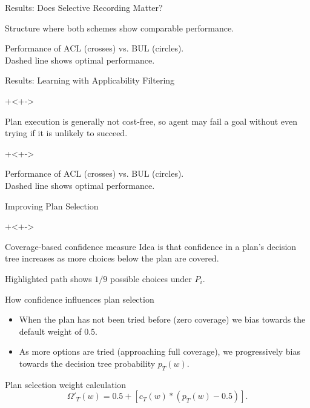 \documentclass[]{beamer}
\begin{document}
\begin{frame}[allowframebreaks]{Results: Does Selective Recording Matter?}

\centering\resizebox{.7\paperwidth}{!}{}

Structure where both schemes show \alert{comparable performance}.

\centering\resizebox{.7\paperwidth}{!}{}

Performance of ACL (crosses) vs. BUL (circles). \\Dashed line shows optimal performance.

\end{frame}

\begin{frame}{Results: Learning with Applicability Filtering}

\onslide+<+->

\begin{block}{}
Plan execution is generally not cost-free, so agent may fail a goal \alert{without even trying} if it is unlikely to succeed.
\end{block}
\onslide+<+->

\centering\resizebox{.7\paperwidth}{!}{}

Performance of ACL (crosses) vs. BUL (circles). \\Dashed line shows optimal performance.

\end{frame}

\begin{frame}[allowframebreaks]{Improving Plan Selection}

\onslide+<+->
\begin{block}{Coverage-based confidence measure}
Idea is that confidence in a plan's decision tree increases as more choices below the plan are \alert{covered}.
\end{block}

\centering\resizebox{.6\paperwidth}{!}{}

Highlighted path shows $1/9$ possible choices under $P_i$.

\begin{block}{How confidence influences plan selection}
\begin{itemize}
\item When the plan has not been tried before (zero coverage) we bias towards the default weight of $0.5$.
\item As more options are tried (approaching full coverage), we progressively bias towards the decision tree probability $p_T(w)$.
\end{itemize}
\end{block}
\begin{block}{Plan selection weight calculation}
\begin{equation*}
\Omega'_T(w) = 0.5 + \left[  c_T(w) *  \left( p_T(w) - 0.5 \right)  \right].
\end{equation*}
\end{block}
\end{frame}
\end{document}
